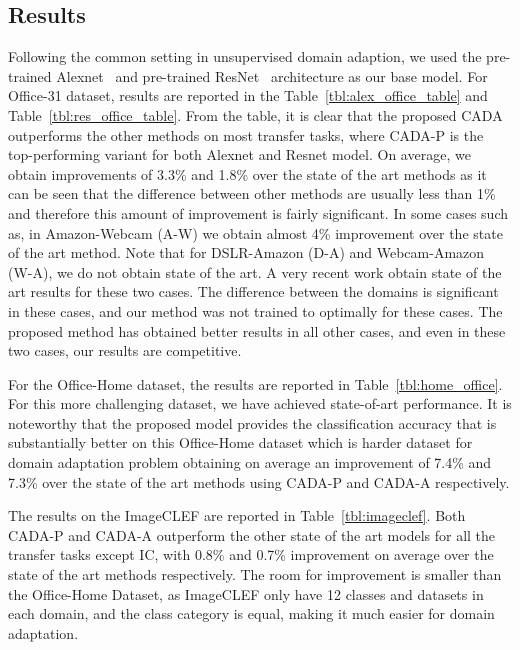 \documentclass[10pt,twocolumn,letterpaper]{article}
\begin{document}
\subsection{Results}
\vspace{-0.5em}
Following the common setting in unsupervised domain adaption, we used the pre-trained Alexnet~\cite{krizhevsky_NIPS2012} and pre-trained ResNet~\cite{he2016deep} architecture as our base model.
For Office-31 dataset, results are reported in the Table~\ref{tbl:alex_office_table} and Table~\ref{tbl:res_office_table}. From the table, it is clear that the proposed CADA  outperforms the other methods on most transfer tasks, where CADA-P is the top-performing variant for both Alexnet and Resnet model. On average, we obtain improvements of 3.3\% and 1.8\% over the state of the art methods as it can be seen that the difference between other methods are usually less than 1\% and therefore this amount of improvement is fairly significant. In some cases such as, in Amazon-Webcam (A-W) we obtain almost 4\% improvement over the state of the art method. Note that for DSLR-Amazon (D-A) and Webcam-Amazon (W-A), we do not obtain state of the art. A very recent work  \cite{Kang_2018_ECCV} obtain state of the art results for these two cases. The difference between the domains is significant in these cases, and our method was not trained to optimally for these cases. The proposed method has obtained better results in all other cases, and even in these two cases, our results are competitive. 

For the Office-Home dataset, the results are reported in Table~\ref{tbl:home_office}.  For this more challenging dataset, we have achieved state-of-art performance. It is noteworthy that the proposed model provides the classification accuracy that is substantially better on this Office-Home dataset which is harder dataset for domain adaptation problem obtaining on average an improvement of 7.4\% and 7.3\% over the state of the art methods using CADA-P and CADA-A respectively.

The results on the ImageCLEF are reported in Table~\ref{tbl:imageclef}. Both CADA-P and CADA-A outperform the other state of the art models for all the transfer tasks except IC, with 0.8\% and 0.7\% improvement on average over the state of the art methods respectively.
The room for improvement is smaller than the Office-Home Dataset, as ImageCLEF only have 12 classes and datasets in each domain, and the class category is equal, making it much easier for domain adaptation.
\end{document}
